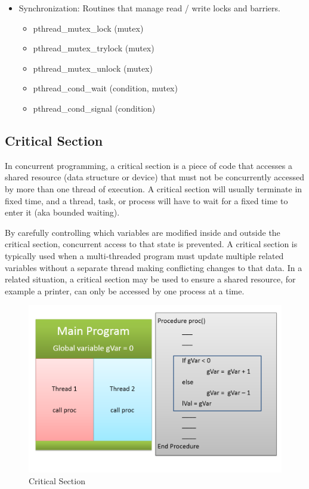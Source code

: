 \begin{itemize}
\item Synchronization: Routines that manage read / write locks and barriers.
\begin{itemize}
\item pthread\_mutex\_lock (mutex)
\item pthread\_mutex\_trylock (mutex)
\item pthread\_mutex\_unlock (mutex)
\item pthread\_cond\_wait (condition, mutex)
\item pthread\_cond\_signal (condition)
\end{itemize}
\end{itemize}


\subsection{Critical Section}
In concurrent programming, a critical section is a piece of code that accesses a shared resource (data structure or device) that must not be concurrently accessed by more than one thread of execution. A critical section will usually terminate in fixed time, and a thread, task, or process will have to wait for a fixed time to enter it (aka bounded waiting).

By carefully controlling which variables are modified inside and outside the critical section, concurrent access to that state is prevented. A critical section is typically used when a multi-threaded program must update multiple related variables without a separate thread making conflicting changes to that data. In a related situation, a critical section may be used to ensure a shared resource, for example a printer, can only be accessed by one process at a time.
\begin{figure}[H]
\centering
\includegraphics[scale=0.5]{critical_section.png}
\caption{Critical Section}
\label{<<Label>>}
\end{figure}
